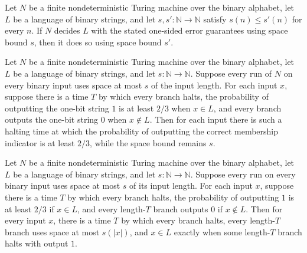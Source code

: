 \begin{theorem}
\label{Turing.FinNDTM.RDecidesInSpace.mono}
\leanok
{}
Let $N$ be a finite nondeterministic Turing machine over the binary alphabet, let $L$ be
a language of binary strings, and let $s,s':\mathbb{N}\to\mathbb{N}$ satisfy $s(n)\le
s'(n)$ for every $n$. If $N$ decides $L$ with the stated one-sided error guarantees
using space bound $s$, then it does so using space bound $s'$.
\end{theorem}

\begin{theorem}
\label{Turing.FinNDTM.RDecidesInSpace.bpDecidesInSpace}
\leanok
{}
Let $N$ be a finite nondeterministic Turing machine over the binary alphabet, let $L$ be
a language of binary strings, and let $s:\mathbb{N}\to\mathbb{N}$. Suppose every run of
$N$ on every binary input uses space at most $s$ of the input length. For each input
$x$, suppose there is a time $T$ by which every branch halts, the probability of
outputting the one-bit string $1$ is at least $2/3$ when $x\in L$, and every branch
outputs the one-bit string $0$ when $x\notin L$. Then for each input there is such a
halting time at which the probability of outputting the correct membership indicator is
at least $2/3$, while the space bound remains $s$.
\end{theorem}

\begin{theorem}
\label{Turing.FinNDTM.RDecidesInSpace.decidesInSpace}
\leanok
{}
Let $N$ be a finite nondeterministic Turing machine over the binary alphabet, let $L$ be
a language of binary strings, and let $s:\mathbb{N}\to\mathbb{N}$. Suppose every run on
every binary input uses space at most $s$ of its input length. For each input $x$,
suppose there is a time $T$ by which every branch halts, the probability of outputting
$1$ is at least $2/3$ if $x\in L$, and every length-$T$ branch outputs $0$ if $x\notin
L$. Then for every input $x$, there is a time $T$ by which every branch halts, every
length-$T$ branch uses space at most $s(|x|)$, and $x\in L$ exactly when some length-$T$
branch halts with output $1$.
\end{theorem}

